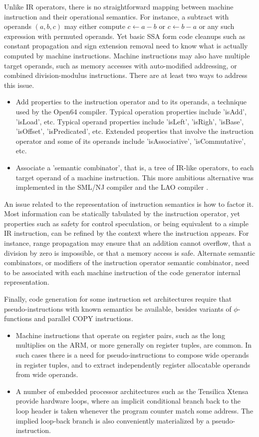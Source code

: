 Unlike IR operators, there is no straightforward mapping between machine
instruction and their operational semantics. For instance, a subtract
with operands $(a,b,c)$ may either compute $c \leftarrow a-b$ or $c
\leftarrow b-a$ or any such expression with permuted operands. Yet basic SSA
form code cleanups such as constant propagation and sign extension removal need
to know what is actually computed by machine instructions.  Machine instructions
may also have multiple target operands, such as memory accesses with
auto-modified addressing, or combined division-modulus instructions.
There are at least two ways to address this issue. \begin{itemize}
\item Add properties to the instruction operator and to its operands, a
technique used by the Open64 compiler. Typical operation properties include
'isAdd', 'isLoad', etc. Typical operand properties include 'isLeft', 'isRigh',
'isBase', 'isOffset', 'isPredicated', etc. Extended properties that involve the
instruction operator and some of its operands include 'isAssociative',
'isCommutative', etc.
\item Associate a 'semantic combinator', that is, a tree of IR-like operators,
to each target operand of a machine instruction. This more ambitious alternative
was implemented in the SML/NJ \cite{Leung:1999:PLDI} compiler and the LAO
compiler \cite{Dinechin:2000:CASES}.  \end{itemize}

An issue related to the representation of instruction semantics is how to factor
it. Most information can be statically tabulated by the instruction operator, yet
properties such as safety for control speculation, or being equivalent to a
simple IR instruction, can be refined by the context where the instruction
appears. For instance, range propagation may ensure that an addition cannot
overflow, that a division by zero is impossible, or that a memory access is safe.
Alternate semantic combinators, or modifiers of the instruction operator semantic
combinator, need to be associated with each machine instruction of the code
generator internal representation.

Finally, code generation for some instruction set architectures require that
pseudo-instructions with known semantics be available, besides variants of
$\phi$-functions and parallel COPY instructions. \begin{itemize}
\item Machine instructions that
operate on register pairs, such as the long multiplies on the ARM, or more
generally on register tuples, are common. In such cases there is a need for
pseudo-instructions to compose wide operands in register tuples, and to extract
independently register allocatable operands from wide operands.
\item A number of embedded processor architectures such as the Tensilica Xtensa
provide hardware loops, where an implicit conditional branch back to the loop
header is taken whenever the program counter match some address. The implied
loop-back branch is also conveniently materialized by a pseudo-instruction.
\end{itemize}

